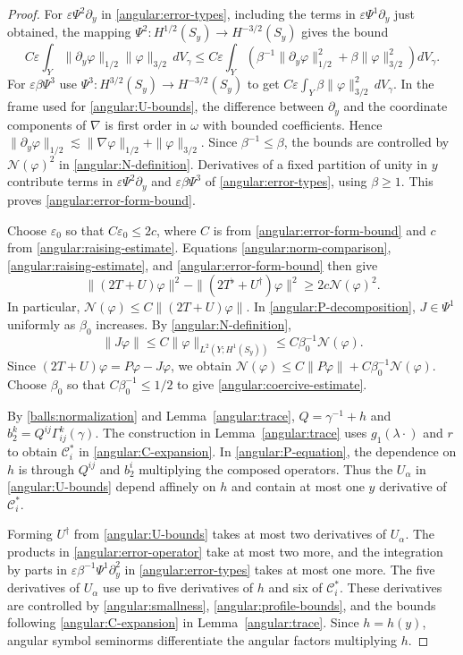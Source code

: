 \documentclass[11pt,a4paper]{article}
\theoremstyle{definition}
\theoremstyle{remark}
\newcommand{\eps}{\varepsilon}
\numberwithin{equation}{section}
\begin{document}
\begin{proof}
For $\eps\Psi^2\partial_y$ in \eqref{angular:error-types}, including
the terms in $\eps\Psi^1\partial_y$ just obtained, the mapping
$\Psi^2:H^{1/2}(S_y)\to H^{-3/2}(S_y)$ gives the bound
\[
 C\eps\int_Y
     \|\partial_y\varphi\|_{1/2}\|\varphi\|_{3/2}\,dV_\gamma
 \le C\eps\int_Y\left(
     \beta^{-1}\|\partial_y\varphi\|_{1/2}^2
                 +\beta\|\varphi\|_{3/2}^2\right)dV_\gamma.
\]
For $\eps\beta\Psi^3$ use $\Psi^3:H^{3/2}(S_y)\to H^{-3/2}(S_y)$
to get $C\eps\int_Y\beta\|\varphi\|_{3/2}^2\,dV_\gamma$.
In the frame used for \eqref{angular:U-bounds}, the difference
between $\partial_y$ and the coordinate components of $\nabla$
is first order in $\omega$ with bounded coefficients. Hence
$\|\partial_y\varphi\|_{1/2}\lesssim
\|\nabla\varphi\|_{1/2}+\|\varphi\|_{3/2}$.
Since $\beta^{-1}\le\beta$, the bounds are controlled by
$\mathcal N(\varphi)^2$ in \eqref{angular:N-definition}.
Derivatives of a fixed partition of unity in $y$ contribute terms
in $\eps\Psi^2\partial_y$ and $\eps\beta\Psi^3$ of
\eqref{angular:error-types}, using $\beta\ge1$. This proves
\eqref{angular:error-form-bound}.

Choose $\eps_0$ so that $C\eps_0\le2c$, where $C$ is from
\eqref{angular:error-form-bound} and $c$ from
\eqref{angular:raising-estimate}. Equations
\eqref{angular:norm-comparison}, \eqref{angular:raising-estimate},
and \eqref{angular:error-form-bound} then give
\[
 \|(2T+U)\varphi\|^2-
 \|(2T^\flat+U^\dagger)\varphi\|^2
 \ge2c\mathcal N(\varphi)^2.
\]
In particular, $\mathcal N(\varphi)\le C\|(2T+U)\varphi\|$.
In \eqref{angular:P-decomposition}, $J\in\Psi^1$ uniformly as
$\beta_0$ increases. By \eqref{angular:N-definition},
\[
 \|J\varphi\|\le C\|\varphi\|_{L^2(Y;H^1(S_y))}
                         \le C\beta_0^{-1}\mathcal N(\varphi).
\]
Since $(2T+U)\varphi=P\varphi-J\varphi$, we obtain
$\mathcal N(\varphi)\le C\|P\varphi\|+C\beta_0^{-1}\mathcal N(\varphi)$.
Choose $\beta_0$ so that $C\beta_0^{-1}\le1/2$ to give
\eqref{angular:coercive-estimate}.

By \eqref{balls:normalization} and Lemma~\ref{angular:trace},
$Q=\gamma^{-1}+h$ and $b_2^k=Q^{ij}\Gamma^k_{ij}(\gamma)$.
The construction in Lemma~\ref{angular:trace} uses $g_1(\lambda\cdot)$
and $r$ to obtain $\mathcal C_i^*$ in \eqref{angular:C-expansion}.
In \eqref{angular:P-equation}, the dependence on $h$ is through
$Q^{ij}$ and $b_2^i$ multiplying the composed operators. Thus
the $U_\alpha$ in \eqref{angular:U-bounds} depend affinely on $h$
and contain at most one $y$ derivative of $\mathcal C_i^*$.

Forming $U^\dagger$ from \eqref{angular:U-bounds} takes at most
two derivatives of $U_\alpha$. The products in
\eqref{angular:error-operator} take at most two more, and the
integration by parts in $\eps\beta^{-1}\Psi^1\partial_y^2$ in
\eqref{angular:error-types} takes at most one more. The five
derivatives of $U_\alpha$ use up to five derivatives of $h$
and six of $\mathcal C_i^*$. These derivatives are controlled by
\eqref{angular:smallness}, \eqref{angular:profile-bounds}, and the
bounds following \eqref{angular:C-expansion} in Lemma~\ref{angular:trace}.
Since $h=h(y)$, angular symbol seminorms differentiate the
angular factors multiplying $h$.
\end{proof}
\end{document}
